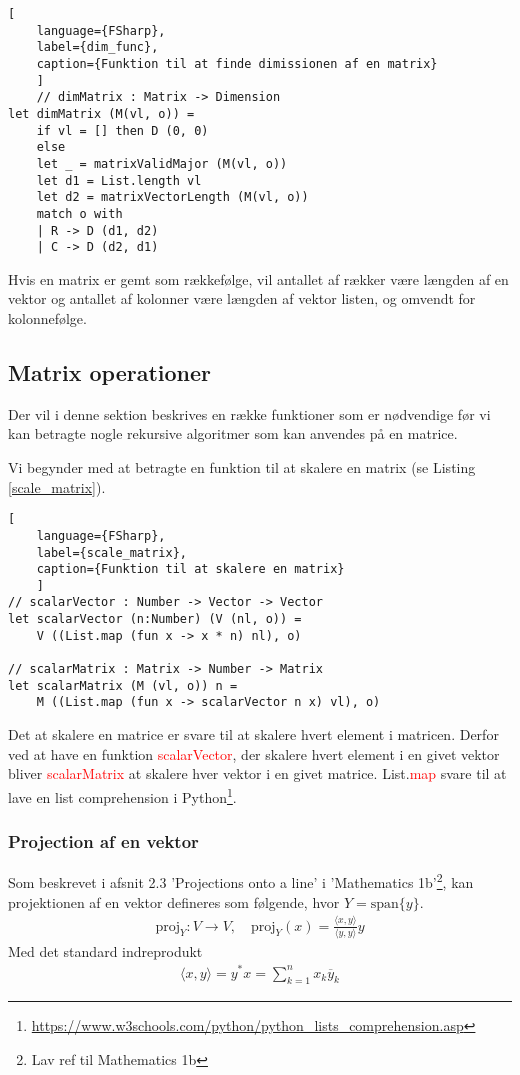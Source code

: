 \begin{lstlisting}[
    language={FSharp}, 
    label={dim_func}, 
    caption={Funktion til at finde dimissionen af en matrix}
    ]
    // dimMatrix : Matrix -> Dimension
let dimMatrix (M(vl, o)) =
    if vl = [] then D (0, 0)
    else
    let _ = matrixValidMajor (M(vl, o))
    let d1 = List.length vl
    let d2 = matrixVectorLength (M(vl, o))
    match o with
    | R -> D (d1, d2)
    | C -> D (d2, d1)
\end{lstlisting}

Hvis en matrix er gemt som rækkefølge, vil antallet af rækker være længden af en vektor og antallet af kolonner være længden af vektor listen, og omvendt for kolonnefølge.

\subsection{Matrix operationer}
Der vil i denne sektion beskrives en række funktioner som er nødvendige før vi kan betragte nogle rekursive algoritmer som kan anvendes på en matrice.

Vi begynder med at betragte en funktion til at skalere en matrix (se Listing \ref{scale_matrix}). 

\begin{lstlisting}[
    language={FSharp}, 
    label={scale_matrix}, 
    caption={Funktion til at skalere en matrix}
    ]
// scalarVector : Number -> Vector -> Vector
let scalarVector (n:Number) (V (nl, o)) = 
    V ((List.map (fun x -> x * n) nl), o)

// scalarMatrix : Matrix -> Number -> Matrix
let scalarMatrix (M (vl, o)) n = 
    M ((List.map (fun x -> scalarVector n x) vl), o)
\end{lstlisting}

Det at skalere en matrice er svare til at skalere hvert element i matricen. Derfor ved at have en funktion \textcolor{red}{scalarVector}, der skalere hvert element i en givet vektor bliver \textcolor{red}{scalarMatrix} at skalere hver vektor i en givet matrice. List.\textcolor{red}{map} svare til at lave en list comprehension i Python\footnote{\url{https://www.w3schools.com/python/python_lists_comprehension.asp}}.


\subsubsection{Projection af en vektor}
Som beskrevet i afsnit 2.3 'Projections onto a line' i 'Mathematics 1b'\footnote{Lav ref til Mathematics 1b}, kan projektionen af en vektor defineres som følgende, hvor $Y = \text{span}\{y\}$.
\begin{align}
    \text{proj}_Y : V \rightarrow V, \quad \text{proj}_Y(x) = \frac{\langle x, y \rangle}{\langle y, y \rangle} y
    \label{proj}
\end{align}
Med det standard indreprodukt 
\begin{align}
    \langle x, y \rangle = y^* x =\sum_{k=1}^{n} x_k \overline{y}_k
\end{align}

